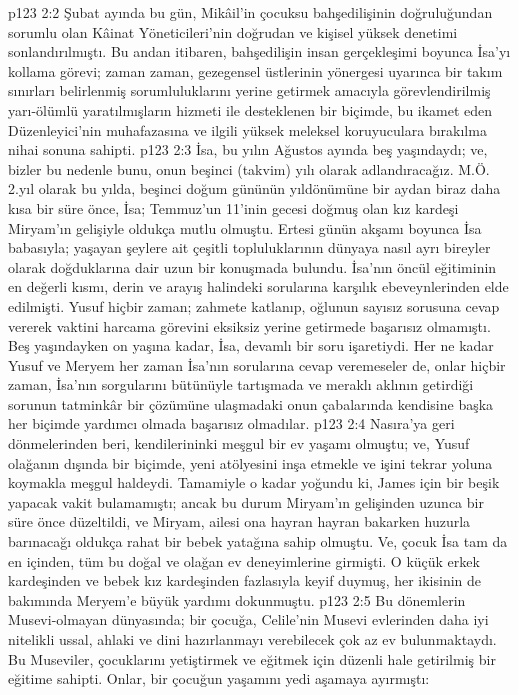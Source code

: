 \vs p123 2:2 Şubat ayında bu gün, Mikâil’in çocuksu bahşedilişinin doğruluğundan sorumlu olan Kâinat Yöneticileri’nin doğrudan ve kişisel yüksek denetimi sonlandırılmıştı. Bu andan itibaren, bahşedilişin insan gerçekleşimi boyunca İsa’yı kollama görevi; zaman zaman, gezegensel üstlerinin yönergesi uyarınca bir takım sınırları belirlenmiş sorumluluklarını yerine getirmek amacıyla görevlendirilmiş yarı\hyp{}ölümlü yaratılmışların hizmeti ile desteklenen bir biçimde, bu ikamet eden Düzenleyici’nin muhafazasına ve ilgili yüksek meleksel koruyuculara bırakılma nihai sonuna sahipti.
\vs p123 2:3 İsa, bu yılın Ağustos ayında beş yaşındaydı; ve, bizler bu nedenle bunu, onun beşinci (takvim) yılı olarak adlandıracağız. M.Ö. 2.yıl olarak bu yılda, beşinci doğum gününün yıldönümüne bir aydan biraz daha kısa bir süre önce, İsa; Temmuz’un 11’inin gecesi doğmuş olan kız kardeşi Miryam’ın gelişiyle oldukça mutlu olmuştu. Ertesi günün akşamı boyunca İsa babasıyla; yaşayan şeylere ait çeşitli topluluklarının dünyaya nasıl ayrı bireyler olarak doğduklarına dair uzun bir konuşmada bulundu. İsa’nın öncül eğitiminin en değerli kısmı, derin ve arayış halindeki sorularına karşılık ebeveynlerinden elde edilmişti. Yusuf hiçbir zaman; zahmete katlanıp, oğlunun sayısız sorusuna cevap vererek vaktini harcama görevini eksiksiz yerine getirmede başarısız olmamıştı. Beş yaşındayken on yaşına kadar, İsa, devamlı bir soru işaretiydi. Her ne kadar Yusuf ve Meryem her zaman İsa’nın sorularına cevap veremeseler de, onlar hiçbir zaman, İsa’nın sorgularını bütünüyle tartışmada ve meraklı aklının getirdiği sorunun tatminkâr bir çözümüne ulaşmadaki onun çabalarında kendisine başka her biçimde yardımcı olmada başarısız olmadılar.
\vs p123 2:4 Nasıra’ya geri dönmelerinden beri, kendilerininki meşgul bir ev yaşamı olmuştu; ve, Yusuf olağanın dışında bir biçimde, yeni atölyesini inşa etmekle ve işini tekrar yoluna koymakla meşgul haldeydi. Tamamiyle o kadar yoğundu ki, James için bir beşik yapacak vakit bulamamıştı; ancak bu durum Miryam’ın gelişinden uzunca bir süre önce düzeltildi, ve Miryam, ailesi ona hayran hayran bakarken huzurla barınacağı oldukça rahat bir bebek yatağına sahip olmuştu. Ve, çocuk İsa tam da en içinden, tüm bu doğal ve olağan ev deneyimlerine girmişti. O küçük erkek kardeşinden ve bebek kız kardeşinden fazlasıyla keyif duymuş, her ikisinin de bakımında Meryem’e büyük yardımı dokunmuştu.
\vs p123 2:5 Bu dönemlerin Musevi\hyp{}olmayan dünyasında; bir çocuğa, Celile’nin Musevi evlerinden daha iyi nitelikli ussal, ahlaki ve dini hazırlanmayı verebilecek çok az ev bulunmaktaydı. Bu Museviler, çocuklarını yetiştirmek ve eğitmek için düzenli hale getirilmiş bir eğitime sahipti. Onlar, bir çocuğun yaşamını yedi aşamaya ayırmıştı:
